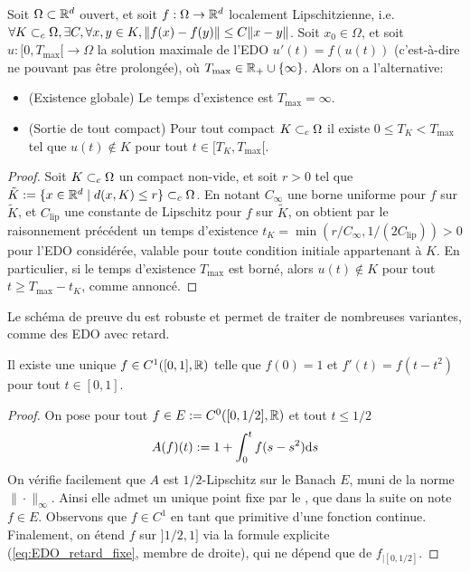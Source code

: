 \begin{corollary}
\label{corol:CauchyLipAuton}
	Soit $\Omega \subset \mathbb{R}^d$ ouvert, et soit $f : \Omega \to \mathbb{R}^d$ localement Lipschitzienne, i.e.\ $\forall K\subset_c \Omega, \exists C, \forall x,y \in K, \|f(x)-f(y)\| \leq C \|x-y\|$.
	Soit $x_0 \in \Omega$, et soit $u : [0,T_{\max}[ \to \Omega$ la solution maximale de l'EDO $u'(t) = f(u(t))$ (c'est-à-dire ne pouvant pas être prolongée), où $T_{\max} \in \mathbb{R}_+ \cup \{\infty\}$.
	Alors on a l'alternative:
	\begin{itemize}
		\item (Existence globale) Le temps d'existence est $T_{\max} = \infty$. 
		\item (Sortie de tout compact) Pour tout compact $K \subset_c \Omega$ il existe $0 \leq T_K < T_{\max}$ tel que $u(t) \notin K$ pour tout $t \in [T_K,T_{\max}[$. 
	\end{itemize} 
\end{corollary}

\begin{proof}
Soit $K \subset_c \Omega$ un compact non-vide, et soit $r>0$ tel que $\tilde K := \{x \in \mathbb{R}^d \mid d(x,K) \leq r\} \subset_c \Omega$.
En notant $C_{\infty}$  une borne uniforme pour $f$ sur $\tilde K$, et $C_{\mathrm{lip}}$ une constante de Lipschitz pour $f$ sur $\tilde K$, on obtient par le raisonnement précédent un temps d'existence $t_K = \min(r/C_\infty,1/(2C_{\mathrm{lip}}))>0$ pour l'EDO considérée, valable pour toute condition initiale appartenant à $K$. 
En particulier, si le temps d'existence $T_{\max}$ est borné, alors $u(t) \notin K$ pour tout $t \geq T_{\max}-t_K$, comme annoncé.
\end{proof}

Le schéma de preuve du  est robuste et permet de traiter de nombreuses variantes, comme des EDO avec retard.
\begin{exemple}
\label{ex:EDretard}
%
	Il existe une unique $f\in C^1([0,1],\mathbb{R})$ telle que $f(0)=1$ et $f'(t)=f(t-t^2)$ pour tout $t \in [0,1]$. 
\end{exemple}

\begin{proof}
On pose pour tout $f \in E := C^0([0,1/2],\mathbb{R})$ et tout $t\leq 1/2$
\begin{equation}
\label{eq:EDO_retard_fixe}
A(f)(t) := 1+\int_0^t f(s-s^2) \mathrm{d} s
\end{equation}
On vérifie facilement que $A$ est $1/2$-Lipschitz sur le Banach $E$, muni de la norme $\|\cdot\|_\infty$. Ainsi elle admet un unique point fixe par le , que dans la suite on note $f\in E$. Observons que $f\in C^1$ en tant que primitive d'une fonction continue.
Finalement, on étend $f$ sur $]1/2,1]$ via la formule explicite (\ref{eq:EDO_retard_fixe}, membre de droite), qui ne dépend que de $f_{|[0,1/2]}$.
\end{proof}



